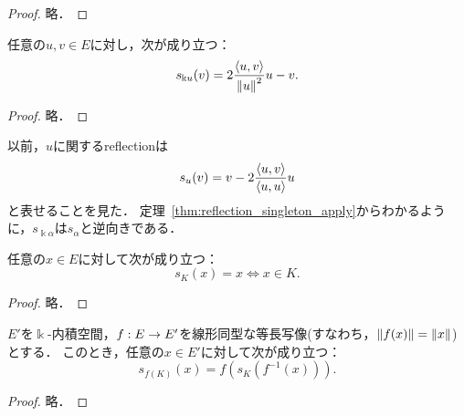 \begin{proof}
  \leanok
  略．
\end{proof}

\begin{theorem}
  \label{thm:reflection_singleton_apply}
  \leanok
  任意の$u, v \in E$に対し，次が成り立つ：
  \begin{equation}
    s_{\Bbbk u}(v) = 2 \frac{\left\langle u, v \right\rangle}{\left\| u \right\|^2}u - v.
  \end{equation}
\end{theorem}

\begin{proof}
  \leanok
  略．
\end{proof}

\begin{remark}
  以前，$u$に関するreflectionは
  \begin{equation}
    s_u (v) = v - 2\frac{\left\langle u, v \right\rangle}{\left\langle u, u \right\rangle} u
  \end{equation}
  と表せることを見た．
  定理~\ref{thm:reflection_singleton_apply}からわかるように，$s_{\Bbbk \alpha}$は$s_\alpha$と逆向きである．
\end{remark}

\begin{theorem}
  \label{thm:reflection_eq_self_iff}
  \leanok
  任意の$x \in E$に対して次が成り立つ：
  \begin{equation}
    s_K(x) = x \iff x \in K.
  \end{equation}
\end{theorem}

\begin{proof}
  \leanok
  略．
\end{proof}

\begin{theorem}
  \label{thm:reflection_map_apply}
  \leanok
  $E'$を$\Bbbk $-内積空間，$f : E \rightarrow E'$を線形同型な等長写像(すなわち，$\left\| f(x) \right\| = \left\| x \right\|$)とする．
  このとき，任意の$x \in E'$に対して次が成り立つ：
  \begin{equation}
    s_{f(K)}(x) = f(s_K(f^{-1}(x))).
  \end{equation}
\end{theorem}

\begin{proof}
  \leanok
  略．
\end{proof}

